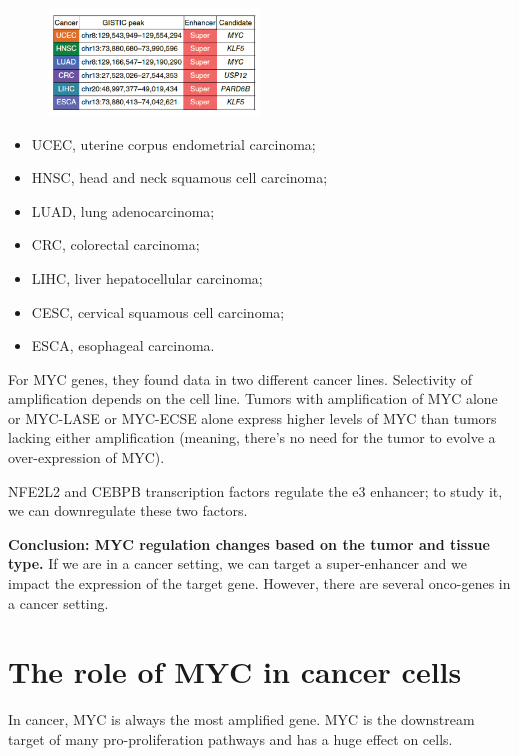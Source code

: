 \begin{figure}
\centering
\includegraphics[width=0.5\textwidth]{../_resources/796c982294bedb0a7994a942aa5ff2a5.png}
\caption{}
\label{fig:study}
\end{figure}

\begin{itemize}
\item UCEC, uterine corpus endometrial carcinoma; 
\item HNSC, head and neck squamous cell carcinoma; 
\item LUAD, lung adenocarcinoma; 
\item CRC, colorectal carcinoma; 
\item LIHC, liver hepatocellular carcinoma; 
\item CESC, cervical squamous cell carcinoma; 
\item ESCA, esophageal carcinoma.
\end{itemize}

For MYC genes, they found data in two different cancer lines. Selectivity of amplification depends on the cell line.
Tumors with amplification of MYC alone or MYC-LASE or MYC-ECSE alone express higher levels of MYC than tumors lacking either amplification (meaning, there's no need for the tumor to evolve a over-expression of MYC).

NFE2L2 and CEBPB transcription factors regulate the e3 enhancer; to study it, we can downregulate these two factors.

\textbf{Conclusion: MYC regulation changes based on the tumor and tissue type.}
If we are in a cancer setting, we can target a super-enhancer and we impact the expression of the target gene. However, there are several onco-genes in a cancer setting.

\hypertarget{the-role-of-myc-in-cancer-cells}{%
\section{The role of MYC in cancer cells}\label{the-role-of-myc-in-cancer-cells}}

In cancer, MYC is always the most amplified gene. MYC is the downstream target of many pro-proliferation pathways and has a huge effect on cells.

